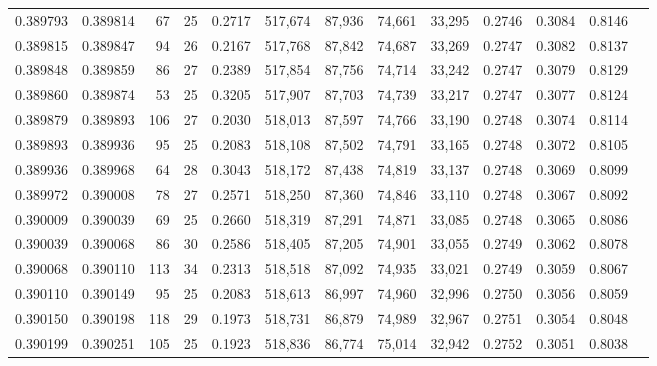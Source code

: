 \begin{tabular}{rrrrrrrrrrrrr}
0.389793 & 0.389814 &    67 &  25 &                                     0.2717 & 517,674 &  87,936 &  74,661 &  33,295 & 0.2746 & 0.3084 & 0.8146 \\
0.389815 & 0.389847 &    94 &  26 &                                     0.2167 & 517,768 &  87,842 &  74,687 &  33,269 & 0.2747 & 0.3082 & 0.8137 \\
0.389848 & 0.389859 &    86 &  27 &                                     0.2389 & 517,854 &  87,756 &  74,714 &  33,242 & 0.2747 & 0.3079 & 0.8129 \\
0.389860 & 0.389874 &    53 &  25 &                                     0.3205 & 517,907 &  87,703 &  74,739 &  33,217 & 0.2747 & 0.3077 & 0.8124 \\
0.389879 & 0.389893 &   106 &  27 &                                     0.2030 & 518,013 &  87,597 &  74,766 &  33,190 & 0.2748 & 0.3074 & 0.8114 \\
0.389893 & 0.389936 &    95 &  25 &                                     0.2083 & 518,108 &  87,502 &  74,791 &  33,165 & 0.2748 & 0.3072 & 0.8105 \\
0.389936 & 0.389968 &    64 &  28 &                                     0.3043 & 518,172 &  87,438 &  74,819 &  33,137 & 0.2748 & 0.3069 & 0.8099 \\
0.389972 & 0.390008 &    78 &  27 &                                     0.2571 & 518,250 &  87,360 &  74,846 &  33,110 & 0.2748 & 0.3067 & 0.8092 \\
0.390009 & 0.390039 &    69 &  25 &                                     0.2660 & 518,319 &  87,291 &  74,871 &  33,085 & 0.2748 & 0.3065 & 0.8086 \\
0.390039 & 0.390068 &    86 &  30 &                                     0.2586 & 518,405 &  87,205 &  74,901 &  33,055 & 0.2749 & 0.3062 & 0.8078 \\
0.390068 & 0.390110 &   113 &  34 &                                     0.2313 & 518,518 &  87,092 &  74,935 &  33,021 & 0.2749 & 0.3059 & 0.8067 \\
0.390110 & 0.390149 &    95 &  25 &                                     0.2083 & 518,613 &  86,997 &  74,960 &  32,996 & 0.2750 & 0.3056 & 0.8059 \\
0.390150 & 0.390198 &   118 &  29 &                                     0.1973 & 518,731 &  86,879 &  74,989 &  32,967 & 0.2751 & 0.3054 & 0.8048 \\
0.390199 & 0.390251 &   105 &  25 &                                     0.1923 & 518,836 &  86,774 &  75,014 &  32,942 & 0.2752 & 0.3051 & 0.8038 \\

\end{tabular}

